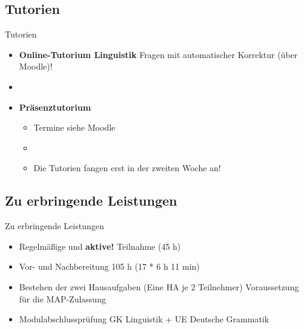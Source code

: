 %
\subsection{Tutorien}

\begin{frame}{Tutorien}

	\begin{itemize}
		\item \textbf{Online-Tutorium Linguistik} \ras Fragen mit automatischer Korrektur (über Moodle)!\\
		\item[]
		\item \textbf{Präsenztutorium}
		
		\begin{itemize}
			\item Termine siehe Moodle %
			\item[]
			\item Die Tutorien fangen erst in der zweiten Woche an!
		\end{itemize}
		
	\end{itemize}
	
\end{frame}


%
\subsection{Zu erbringende Leistungen}

\begin{frame}{Zu erbringende Leistungen}

	\begin{itemize}
	\item Regelmäßige und \textbf{aktive!} Teilnahme (45 h)
        \item Vor- und Nachbereitung 105 h (17 * 6 h 11 min)
	\item Bestehen der zwei Hausaufgaben (Eine HA je 2 Teilnehmer) \ras Voraussetzung für die MAP-Zulassung
	\item Modulabschlussprüfung \ras GK Linguistik + UE Deutsche Grammatik
	\end{itemize}
	
\end{frame}


